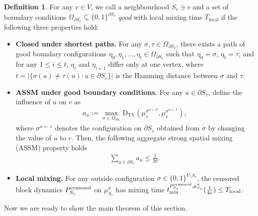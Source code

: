 \documentclass[11pt]{amsart}
\def\-#1{\mathrm{#1}}
\newcommand{\abs}[1]{\ensuremath{\left\vert#1\right\vert}}
\newcommand{\defeq}{:=}
\newcommand{\DTV}[2]{\-D_{\mathrm{TV}}\left({#1},{#2}\right)}
\theoremstyle{definition}
\newtheorem{definition}[theorem]{Definition}
\theoremstyle{remark}
\begin{document}
\begin{definition}\label{def:correlation-decay}
  For any $v \in V$, we call a neighbourhood $S_v \ni v$ and a set of boundary conditions $\Omega_{\partial S_v} \subseteq \{0,1\}^{\partial S_v}$ \emph{good} with local mixing time $T_{\text{local}}$ if the following three properties hold:
\begin{itemize}
  \item \textbf{Closed under shortest paths.} For any $\sigma,\tau \in \Omega_{\partial S_v}$, 
    there exists a path of good boundary configurations $\eta_0,\eta_1,\ldots,\eta_t \in \Omega_{\partial S_v}$ such that $\eta_0 = \sigma$, $\eta_t = \tau$, 
    and for any $1 \leq i \leq t$, $\eta_i$ and $\eta_{i+1}$ differ only at one vertex, where $t = \abs{\{\sigma(u) \neq \tau(u): u \in \partial S_v\}}$ is the Hamming distance between $\sigma$ and $\tau$.
  \item \textbf{ASSM under good boundary conditions.} For any $u \in \partial S_v$, define the influence of $u$ on $v$ as
    \begin{align}\label{eq:influence}
      a_u \defeq \max_{\sigma \in \Omega_{\partial S_v}} \DTV{\mu^{\sigma^{u \gets 0}}_v}{\mu^{\sigma^{u \gets 1}}_v},
    \end{align}
    where $\sigma^{u \gets c}$ denotes the configuration on $\partial S_v$ obtained from $\sigma$ by changing the value of $u$ to $c$. Then, the following aggregate strong spatial mixing (ASSM) property holds
    \begin{align}\label{eq:assm-with-good-boundary}
      \sum_{u \in \partial S_v} a_u \leq \frac{1}{20}.
    \end{align}
  \item \textbf{Local mixing.} For any outside configuration $\sigma \in \{0,1\}^{V \setminus S_v}$, 
    the censored block dynamics $P_{S_v}^{\textnormal{censored}}$ on $\mu^\sigma_{S_v}$ has mixing time $t^{P_{S_v}^{\textnormal{censored}},\mu_{S_v}^\sigma}_{\textnormal{mix}}(\frac{1}{4e}) \leq T_{\text{local}}$.
\end{itemize}
\end{definition}

Now we are ready to show the main theorem of this section.
\end{document}
